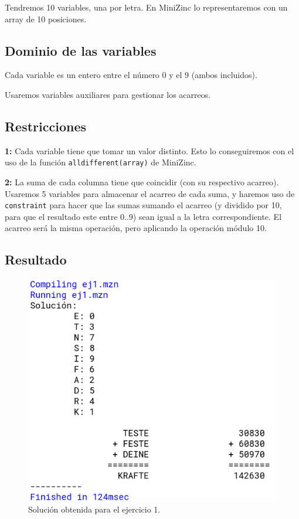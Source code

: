 \documentclass[11pt, spanish]{article}
\begin{document}
Tendremos 10 variables, una por letra. En MiniZinc lo representaremos con un array de 10 posiciones.

\subsection{Dominio de las variables}

Cada variable es un entero entre el número 0 y el 9 (ambos incluidos).

Usaremos variables auxiliares para gestionar los acarreos.

\subsection{Restricciones}

\textbf{1:} Cada variable tiene que tomar un valor distinto. Esto lo conseguiremos con el uso de la función \texttt{alldifferent(array)} de MiniZinc.

\textbf{2:} La suma de cada columna tiene que coincidir (con su respectivo acarreo). Usaremos 5 variables para almacenar el acarreo de cada suma, y haremos uso de \texttt{constraint} para hacer que las sumas sumando el acarreo (y dividido por 10, para que el resultado este entre 0..9) sean igual a la letra correspondiente. El acarreo será la misma operación, pero aplicando la operación módulo 10.


\subsection{Resultado}

\begin{figure}[H]
  \centering
      \includegraphics[scale = 0.30]{sol1.png}
 		 \caption{Solución obtenida para el ejercicio 1.}
  		\label{fig:ej1}

\end{figure}
\end{document}
